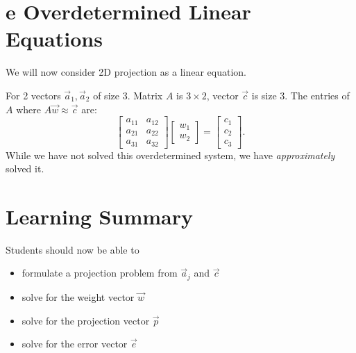 \documentclass[12pt]{book}
\begin{document}
\section*{e Overdetermined Linear Equations}
We will now consider 2D projection as a linear equation. 

For 2 vectors $\vec a_1, \vec a_2$ of size 3. Matrix $A$ is  $3\times 2$, vector $\vec c$ is size 3. 
The entries of  $A$ where  $A\vec w \approx \vec c$ are:
 \[
         \begin{bmatrix} a_{11} & a_{12}\\a_{21} & a_{22}\\ a_{31} & a_{32} \end{bmatrix} \begin{bmatrix} w_1\\w_2 \end{bmatrix} 
         =\begin{bmatrix} c_1 \\ c_2 \\ c_3 \end{bmatrix} 
.\] 
While we have not solved this overdetermined system, we have \textit{approximately} solved it.

\section*{Learning Summary}
Students should now be able to
\begin{itemize}
        \item formulate a projection problem from $\vec a_j$ and  $\vec c$
        \item solve for the weight vector  $\vec w$
        \item solve for the projection vector  $\vec p$
        \item solve for the error vector  $\vec e$
\end{itemize}
\end{document}
